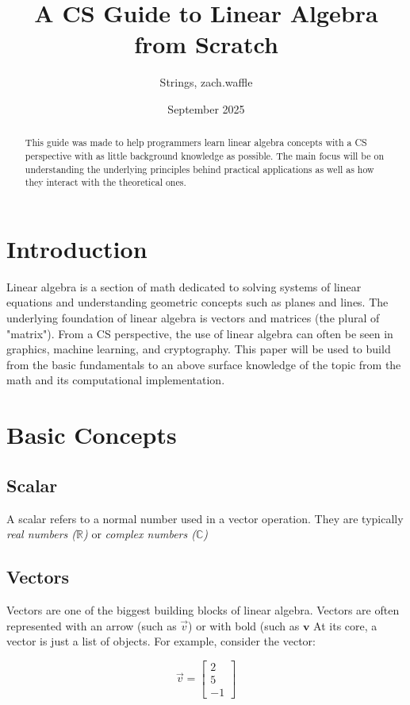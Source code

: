 \documentclass[12pt]{report}
\title{A CS Guide to Linear Algebra from Scratch}
\author{Strings, zach.waffle}
\date{September 2025}
\begin{document}
\maketitle

\begin{abstract}
    This guide was made to help programmers learn linear algebra concepts with a CS perspective with as little background knowledge as possible. The main focus will be on understanding the underlying principles behind practical applications as well as how they interact with the theoretical ones.
\end{abstract}

\chapter{Introduction}
    Linear algebra is a section of math dedicated to solving systems of linear equations and understanding geometric concepts such as planes and lines. The underlying foundation of linear algebra is vectors and matrices (the plural of "matrix"). From a CS perspective, the use of linear algebra can often be seen in graphics, machine learning, and cryptography.
    This paper will be used to build from the basic fundamentals to an above surface knowledge of the topic from the math and its computational implementation.

\chapter{Basic Concepts}
    \section{Scalar}
        A scalar refers to a normal number used in a vector operation.
        They are typically \emph{real numbers ($\mathbb{R}$)} or \emph{complex numbers ($\mathbb{C}$)} 
        
    \section{Vectors}
        Vectors are one of the biggest building blocks of linear algebra. Vectors are often represented with an arrow (such as $\vec{v}$) or with bold (such as $\mathbf{v}$
        At its core, a vector is just a list of objects. For example, consider the vector:

        \begin{equation}
            \vec{v} = \begin{bmatrix} 2 \\ 5 \\ -1 \end{bmatrix}
        \end{equation} \\
\end{document}
